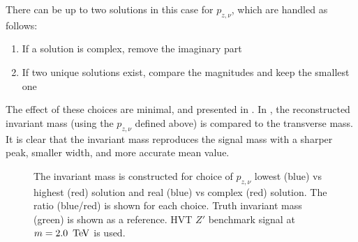 There can be up to two solutions in this case for $p_{z,\nu}$, which are handled as follows:
\begin{enumerate}
	\item If a solution is complex, remove the imaginary part
	\item If two unique solutions exist, compare the magnitudes and keep the smallest one
\end{enumerate}

The effect of these choices are minimal, and presented in \Fig{\ref{fig:neutrinoPz}}. In \Fig{\ref{fig:mass_vs_mt}}, the reconstructed invariant mass (using the $p_{z,\nu}$ defined above) is compared to the transverse mass. It is clear that the invariant mass reproduces the signal mass with a sharper peak, smaller width, and more accurate mean value. 

\begin{figure}[hp]
 \begin{center}
\end{center}
  \caption[Neutrino $p_{z}$ solution comparisons]{The invariant mass is constructed for choice of $p_{z, \nu}$ \protect{} lowest (blue) vs highest (red) solution and \protect{} real (blue) vs complex (red) solution. The ratio (blue/red) is shown for each choice. Truth invariant mass (green) is shown as a reference.  HVT $Z'$ benchmark signal at $m=2.0\,\TeV$ is used.}
  \label{fig:neutrinoPz}
\end{figure}

